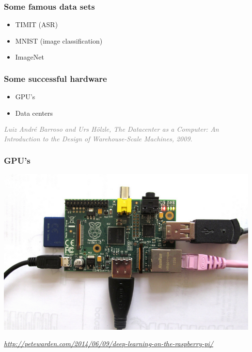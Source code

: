 \documentclass[t]{beamer}
\newcommand\smallgray[1]{\textcolor{gray}{\small\it #1}}
\newcommand\prevwork[1]{\smallgray{#1}}
\begin{document}
\begin{frame}
  \frametitle{Some famous data sets}
  \begin{itemize}
  \item TIMIT (ASR)
  \item MNIST (image classification)
  \item ImageNet
  \end{itemize}
\end{frame}

\begin{frame}
  \frametitle{Some successful hardware}
  \begin{itemize}
  \item GPU's
  \item Data centers
  \end{itemize}
  
  \prevwork{Luiz André Barroso and Urs Hölzle, The Datacenter as a
    Computer: An Introduction to the Design of Warehouse-Scale
    Machines, 2009.}
\end{frame}

\begin{frame}
  \frametitle{GPU's}
  \includegraphics[width=.9\textwidth]{raspberry-pi.png}

  \prevwork{\url{http://petewarden.com/2014/06/09/deep-learning-on-the-raspberry-pi/}}
\end{frame}
\end{document}
